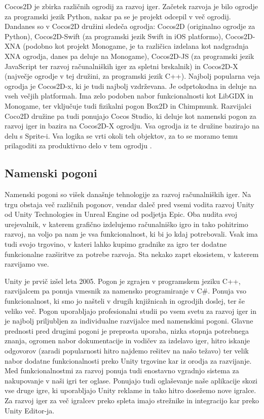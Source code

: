 \documentclass[12pt,a4paper,twoside]{book}
\begin{document}
Cocos2D je zbirka različnih ogrodij za razvoj iger. Začetek razvoja je bilo ogrodje za programski jezik Python, nakar pa se je projekt odcepil v več ogrodij. Dandanes so v Cocos2D družini sledeča ogrodja: Cocos2D (originalno ogrodje za Python), Cocos2D-Swift (za programski jezik Swift in iOS platformo), Cocos2D-XNA (podobno kot projekt Monogame, je ta različica izdelana kot nadgradnja XNA ogrodja, danes pa deluje na Monogame), Cocos2D-JS (za programski jezik JavaScript ter razvoj računalniških iger za spletni brskalnik) in Cocos2D-X (največje ogrodje v tej družini, za programski jezik C++). Najbolj popularna veja ogrodja je Cocos2D-x, ki je tudi najbolj vzdrževana. Je odprtokodna in deluje na vseh večjih platformah. Ima zelo podoben nabor funkcionalnosti kot LibGDX in Monogame, ter vključuje tudi fizikalni pogon Box2D in Chimpmunk. Razvijalci Coco2D družine pa tudi ponujajo Cocos Studio, ki deluje kot namenski pogon za razvoj iger in bazira na Cocos2D-X ogrodju. Vsa ogrodja iz te družine bazirajo na delu s Sprite-i. Vsa logika se vrti okoli teh objektov, za to se moramo temu prilagoditi za produktivno delo v tem ogrodju \cite{cocos2d}\cite{cocos2dx}.

\subsection{Namenski pogoni}
Namenski pogoni so višek današnje tehnologije za razvoj računalniških iger. Na trgu obstaja več različnih pogonov, vendar daleč pred vsemi vodita razvoj Unity od Unity Technologies in Unreal Engine od podjetja Epic. Oba nudita svoj urejevalnik, v katerem grafično izdelujemo računalniško igro in tako pohitrimo razvoj, na voljo pa nam je vsa funkcionalnost, ki bi jo kdaj potrebovali. Vsak ima tudi svojo trgovino, v kateri lahko kupimo gradnike za igro ter dodatne funkcionalne razširitve za potrebe razvoja. Sta nekako zaprt ekosistem, v katerem razvijamo vse.

Unity je prvič izšel leta 2005. Pogon je zgrajen v programskem jeziku C++, razvijalcem pa ponuja vmesnik za namensko programiranje v C\#. Ponuja vso funkcionalnost, ki smo jo našteli v drugih knjižnicah in ogrodjih doslej, ter še veliko več. Pogon uporabljajo profesionalni studii po vsem svetu za razvoj iger in je najbolj priljubljen za individualne razvijalce med namenskimi pogoni. Glavne prednosti pred drugimi pogoni je preprosta uporaba, nizka stopnja potrebnega znanja, ogromen nabor dokumentacije in vodičev za izdelavo iger, hitro iskanje odgovorov (zaradi popularnosti hitro najdemo rešitev na našo težavo) ter velik nabor dodatne funkcionalnosti preko Unity trgovine kar iz orodja za razvijanje. Med funkcionalnostmi za razvoj ponuja tudi enostavno vgradnjo sistema za nakupovanje v naši igri ter oglase. Ponujajo tudi oglaševanje naše aplikacije skozi vse druge igre, ki uporabljajo Unity reklame in tako hitro dosežemo nove igralce. Za razvoj iger za več igralcev preko spleta imajo strežnike in integracijo kar preko Unity Editor-ja.
\end{document}
